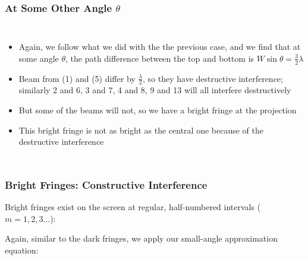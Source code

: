 \documentclass[compress,aspectratio=169]{beamer}
\newcommand{\eq}[2]{\vspace{#1}{\LARGE\begin{displaymath}#2\end{displaymath}}}
\begin{document}
\begin{frame}
  \frametitle{At Some Other Angle $\theta$}
  \begin{columns}

    \begin{itemize}
    \item Again, we follow what we did with the the previous case, and we
      find that at some angle $\theta$, the path difference between the top
      and bottom is $W\sin\theta=\frac{3}{2}\lambda$
    \item Beam from (1) and (5) differ by $\frac{\lambda}{2}$, so they
      have destructive interference; similarly 2 and 6, 3 and 7, 4 and 8,
      9 and 13 will all interfere destructively
    \item But some of the beams will not, so we have a bright fringe at the 
      projection
    \item This bright fringe is not as bright as the central one because
      of the destructive interference
    \end{itemize}
  \end{columns}
\end{frame}



\begin{frame}
  \frametitle{Bright Fringes: Constructive Interference}
  Bright fringes exist on the screen at regular, half-numbered intervals
  ($m=1,2,3\ldots$):

  \eq{-.2in}{
    \boxed{\pm\left(m+\frac{1}{2}\right)\lambda=W\sin\theta_m}
  }
  
  \vspace{-.1in}Again, similar to the dark fringes, we apply our small-angle
  approximation equation:

  \eq{-.2in}{
    \boxed{y_m=\pm\left(m+\frac{1}{2}\right)\frac{\lambda L}{W}}
  }
\end{frame}
\end{document}
